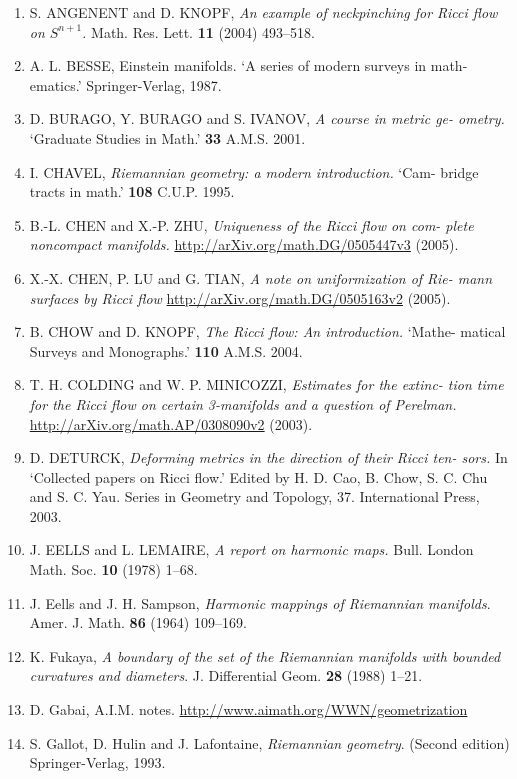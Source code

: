 \begin{enumerate}
\item S. ANGENENT and D. KNOPF, \emph{An example of neckpinching for Ricci
flow on \(S^{n+1}\).} Math. Res. Lett. \textbf{11} (2004) 493--518.
\item A. L. BESSE, Einstein manifolds. `A series of modern surveys in math-
ematics.' Springer-Verlag, 1987.
\item D. BURAGO, Y. BURAGO and S. IVANOV, \emph{A course in metric ge-
ometry.} `Graduate Studies in Math.' \textbf{33} A.M.S. 2001.
\item I. CHAVEL, \emph{Riemannian geometry: a modern introduction.} `Cam-
bridge tracts in math.' \textbf{108} C.U.P. 1995.
\item B.-L. CHEN and X.-P. ZHU, \emph{Uniqueness of the Ricci flow on com-
plete noncompact manifolds.} \url{http://arXiv.org/math.DG/0505447v3}
(2005).
\item X.-X. CHEN, P. LU and G. TIAN, \emph{A note on uniformization of Rie-
mann surfaces by Ricci flow} \url{http://arXiv.org/math.DG/0505163v2}
(2005).
\item B. CHOW and D. KNOPF, \emph{The Ricci flow: An introduction.} `Mathe-
matical Surveys and Monographs.' \textbf{110} A.M.S. 2004.
\item T. H. COLDING and W. P. MINICOZZI, \emph{Estimates for the extinc-
tion time for the Ricci flow on certain 3-manifolds and a question of
Perelman.} \url{http://arXiv.org/math.AP/0308090v2} (2003).
\item D. DETURCK, \emph{Deforming metrics in the direction of their Ricci ten-
sors.} In `Collected papers on Ricci flow.' Edited by H. D. Cao, B.
Chow, S. C. Chu and S. C. Yau. Series in Geometry and Topology, 37.
International Press, 2003.
\item J. EELLS and L. LEMAIRE, \emph{A report on harmonic maps.} Bull. London
Math. Soc. \textbf{10} (1978) 1--68.
\setcounter{enumi}{10}
\item J. Eells and J. H. Sampson, \emph{Harmonic mappings of Riemannian manifolds}. Amer. J. Math. \textbf{86} (1964) 109--169.
\item K. Fukaya, \emph{A boundary of the set of the Riemannian manifolds with bounded curvatures and diameters}. J. Differential Geom. \textbf{28} (1988) 1--21.
\item D. Gabai, A.I.M. notes. \url{http://www.aimath.org/WWN/geometrization}
\item S. Gallot, D. Hulin and J. Lafontaine, \emph{Riemannian geometry}. (Second edition) Springer-Verlag, 1993.

\end{enumerate}
